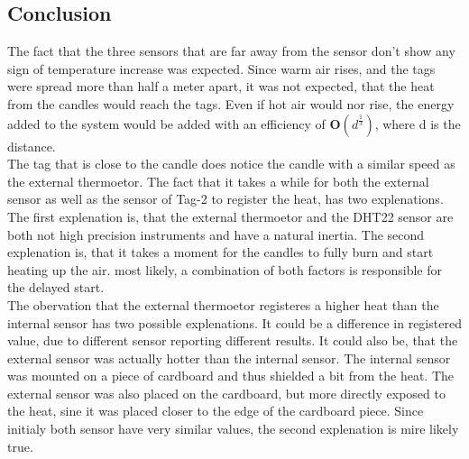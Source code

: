 \subsection{Conclusion}
The fact that the three sensors that are far away from the sensor don't show any sign of temperature increase was expected.
Since warm air rises, and the tags were spread more than half a meter apart, it was not expected, that the heat from the candles would reach the tags.
Even if hot air would nor rise, the energy added to the system would  be added with an efficiency of $\mathbf{O}(d^{\frac{1}{3}})$, where d is the distance.\\
The tag that is close to the candle does notice the candle with a similar speed as the external thermoetor.
The fact that it takes a while for both the external sensor as well as the sensor of Tag-2 to register the heat, has two explenations.
The first explenation is, that the external thermoetor and the DHT22 sensor are both not high precision instruments and have a natural inertia.
The second explenation is, that it takes a moment for the candles to fully burn and start heating up the air.
most likely, a combination of both factors is responsible for the delayed start.\\
The obervation that the external thermoetor registeres a higher heat than the internal sensor has two possible explenations.
It could be a difference in registered value, due to different sensor reporting different results.
It could also be, that the external sensor was actually hotter than the internal sensor.
The internal sensor was mounted on a piece of cardboard and thus shielded a bit from the heat.
The external sensor was also placed on the cardboard, but more directly exposed to the heat, sine it was placed closer to the edge of the cardboard piece.
Since initialy both sensor have very similar values, the second explenation is mire likely true.


